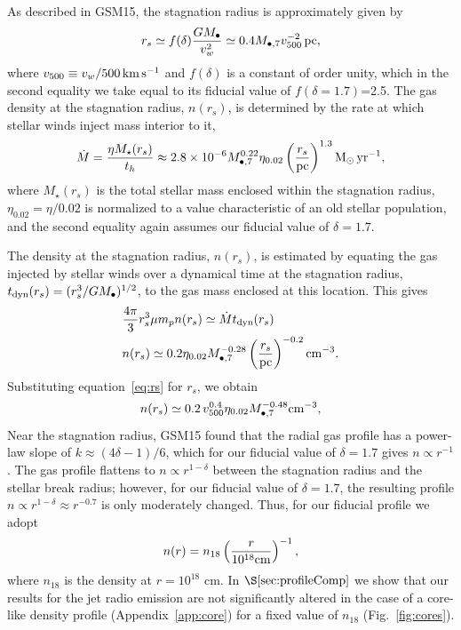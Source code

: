 \documentclass[usenatbib,fleqn]{mnras}
\newcommand{\Mbh}[1][]{M_{\bullet#1}}
\newcommand{\Msun}{{\rm M_\odot}}
\newcommand{\rs}{r_s}
\begin{document}
As described in GSM15, the stagnation radius is approximately given by
\begin{align}
r_s \simeq f(\delta) \frac{G M_{\bullet}}{v_w^2}
  \simeq 0.4 \Mbh[,7] v_{500}^{-2} \,{\rm pc},
\label{eq:rs}
\end{align}
%
where $v_{500}\equiv v_w/500 \,{\rm km\, s^{-1}}$ and $f(\delta)$ is a
constant of order unity, which in the second equality we take equal to
its fiducial value of $f(\delta = 1.7)$=2.5. The gas density at the
stagnation radius, $n(\rs)$, is determined by the rate at which
stellar winds inject mass interior to it,
\begin{equation}
  \dot{M}=\frac{\eta M_{\rm \star}(\rs)}{t_h} \approx  2.8 \times 10^{-6} \Mbh[,7]^{0.22} \eta_{0.02} \left(\frac{r_s}{\rm
      pc}\right)^{1.3} \Msun \, {\rm yr}^{-1},
\label{eq:dotM}
\end{equation}
%
where $M_{\star}(\rs)$ is the total stellar mass enclosed within the
stagnation radius, $\eta_{0.02}=\eta/0.02$ is normalized to a value
characteristic of an old stellar population, and the second equality
again assumes our fiducial value of $\delta=1.7$.

The density at the stagnation radius, $n(\rs)$, is estimated by
equating the gas injected by stellar winds over a dynamical time at
the stagnation radius, $t_{\rm dyn} (\rs)=(\rs^3/G \Mbh)^{1/2}$, to
the gas mass enclosed at this location.  This gives
\begin{align}
  &\frac{4 \pi}{3} \rs^3 \mu m_p n(r_s) \simeq \dot{M} t_{\rm dyn}
  (\rs) \nonumber\\
  & n(r_s) \simeq 0.2 \eta_{0.02} \Mbh[,7]^{-0.28}
  \left(\frac{r_s}{\rm pc}\right)^{-0.2} {\rm cm}^{-3}.
\label{eq:nrs}
\end{align}
%
Substituting equation~\eqref{eq:rs} for $r_s$, we obtain 
\begin{equation}
n(r_s) \simeq 0.2 \, v_{500}^{0.4} \eta_{0.02} \Mbh[,7]^{-0.48} {\rm cm}^{-3},
\label{eq:nrs2}
\end{equation}
%
Near the stagnation radius, GSM15 found that the radial gas profile
has a power-law slope of $k \approx (4\delta-1)/6$, which for our
fiducial value of $\delta=1.7$ gives $n \propto r^{-1}$. The gas
profile flattens to $n\propto r^{1-\delta}$ between the stagnation
radius and the stellar break radius; however, for our fiducial value
of $\delta = 1.7$, the resulting profile $n\propto r^{1-\delta}
\approx r^{-0.7}$ is only moderately changed. Thus, for our fiducial
profile we adopt
\begin{equation} n(r)= n_{18} \left(\frac{r}{10^{18}
    {\rm cm}}\right)^{-1},
\label{eq:profile}
\end{equation}
where $n_{18}$ is the density at $r = 10^{18}$ cm.  In
$\S\ref{sec:profileComp}$ we show that our results for the jet radio
emission are not significantly altered in the case of a core-like
density profile (Appendix~\ref{app:core}) for a fixed value of
$n_{18}$ (Fig.~\ref{fig:cores}).
\end{document}
